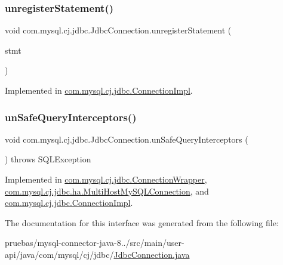 \subsubsection{\texorpdfstring{unregister\+Statement()}{unregisterStatement()}}
{\footnotesize\ttfamily void com.\+mysql.\+cj.\+jdbc.\+Jdbc\+Connection.\+unregister\+Statement (\begin{DoxyParamCaption}\item[{\mbox{\hyperlink{interfacecom_1_1mysql_1_1cj_1_1jdbc_1_1_jdbc_statement}{Jdbc\+Statement}}}]{stmt }\end{DoxyParamCaption})}



Implemented in \mbox{\hyperlink{classcom_1_1mysql_1_1cj_1_1jdbc_1_1_connection_impl_a5f86d22252d24d3b0ddf4cb2c7afd4b7}{com.\+mysql.\+cj.\+jdbc.\+Connection\+Impl}}.

\mbox{\label{interfacecom_1_1mysql_1_1cj_1_1jdbc_1_1_jdbc_connection_a5ffe05b61a153efd3a321b3b4a9a1c7a}} 
\subsubsection{\texorpdfstring{un\+Safe\+Query\+Interceptors()}{unSafeQueryInterceptors()}}
{\footnotesize\ttfamily void com.\+mysql.\+cj.\+jdbc.\+Jdbc\+Connection.\+un\+Safe\+Query\+Interceptors (\begin{DoxyParamCaption}{ }\end{DoxyParamCaption}) throws S\+Q\+L\+Exception}



Implemented in \mbox{\hyperlink{classcom_1_1mysql_1_1cj_1_1jdbc_1_1_connection_wrapper_a2036611c5bf77d053db017e8a991bcc0}{com.\+mysql.\+cj.\+jdbc.\+Connection\+Wrapper}}, \mbox{\hyperlink{classcom_1_1mysql_1_1cj_1_1jdbc_1_1ha_1_1_multi_host_my_s_q_l_connection_aeeb54105383b042016aae9546a2362e2}{com.\+mysql.\+cj.\+jdbc.\+ha.\+Multi\+Host\+My\+S\+Q\+L\+Connection}}, and \mbox{\hyperlink{classcom_1_1mysql_1_1cj_1_1jdbc_1_1_connection_impl_a2d9f577e4a6ccc254081ce8dfd9a3bd8}{com.\+mysql.\+cj.\+jdbc.\+Connection\+Impl}}.



The documentation for this interface was generated from the following file\+:\begin{DoxyCompactItemize}
\item 
pruebas/mysql-\/connector-\/java-\/8../src/main/user-\/api/java/com/mysql/cj/jdbc/\mbox{\hyperlink{_jdbc_connection_8java}{Jdbc\+Connection.\+java}}\end{DoxyCompactItemize}
